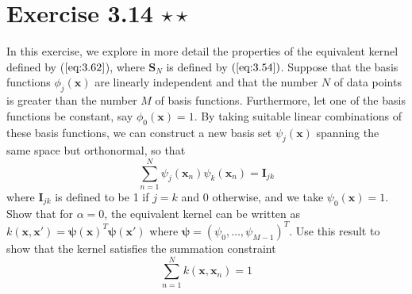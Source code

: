 \section*{Exercise 3.14 $\star \star$}
In this exercise, we explore in more detail the properties of the equivalent
kernel defined by ($\ref{eq:3.62}$), where $\mathbf{S}_N$ is defined by 
$(\ref{eq:3.54})$. Suppose that the basis functions $\phi_j(\mathbf{x})$ are
linearly independent and that the number $N$ of data points is greater
than the number $M$ of basis functions. Furthermore, let one of the basis
functions be constant, say $\phi_0(\mathbf{x}) = 1$. By taking suitable
linear combinations of these basis functions, we can construct a new
basis set $\psi_j(\mathbf{x})$ spanning the same space but orthonormal,
so that 
\begin{equation*}
    \sum_{n=1}^{N} \psi_j(\mathbf{x}_n)\psi_k(\mathbf{x}_n) = \mathbf{I}_{jk}
    \tag{3.115}\label{eq:3.115}
\end{equation*}
where $\mathbf{I}_{jk}$ is defined to be 1 if $j = k$ and 0 otherwise,
and we take $\psi_0(\mathbf{x}) = 1$. Show that for $\alpha = 0$,
the equivalent kernel can be written as 
$k(\mathbf{x}, \mathbf{x'}) = \bm{\psi}(\mathbf{x})^T\bm{\psi}(\mathbf{x'})$ 
where $\bm{\psi} = (\psi_0, \ldots, \psi_{M - 1})^T$. Use this result
to show that the kernel satisfies the summation constraint
\begin{equation*}
    \sum_{n=1}^{N} k(\mathbf{x}, \mathbf{x}_n) = 1
    \tag{3.116}\label{eq:3.116}
\end{equation*}

\vspace{1em}

